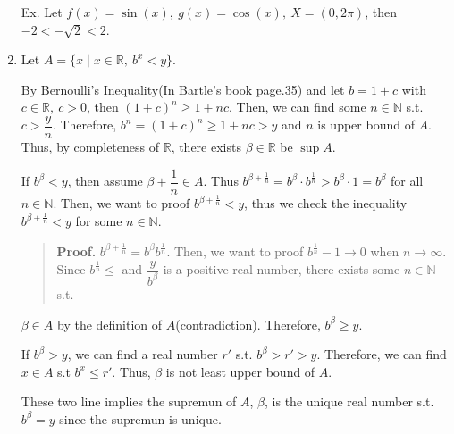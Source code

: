 \documentclass[12pt]{article}
\begin{document}
\begin{enumerate}
    Ex. Let $f(x) = \sin(x),\ g(x) = \cos(x),\ X = (0, 2\pi)$, then $-2 < -\sqrt{2} < 2$.

    \newpage

    \item Let $A = \lbrace x \mid x \in \mathbb{R},\ b^x < y\rbrace$.
    
    By Bernoulli's Inequality(In Bartle's book page.35) and let $b = 1+c$ with $c \in \mathbb{R},\ c > 0$, then $(1+c)^n \geq 1 + nc$.
    Then, we can find some $n \in \mathbb{N}$ s.t. $c > \dfrac{y}{n}$. Therefore, $b^n = (1+c)^n \geq 1+nc > y$ and $n$ is upper bound of $A$. Thus, by completeness of $\mathbb{R}$, there exists $\beta \in \mathbb{R}$ be $\sup A$. 
    
    If $b^\beta < y$, then assume $\beta + \dfrac{1}{n} \in A$. Thus $b^{\beta + \frac{1}{n}} = b^\beta \cdot b^\frac{1}{n} > b^\beta \cdot 1 = b^\beta$ for all $n \in \mathbb{N}$.
    Then, we want to proof $b^{\beta + \frac{1}{n}} < y$, thus we check the inequality $b^{\beta + \frac{1}{n}} < y$ for some $n \in \mathbb{N}$.
    \begin{quote}
        {\bf Proof.} $b^{\beta + \frac{1}{n}} = b^\beta b^{\frac{1}{n}}$. Then, we want to proof $b^{\frac{1}{n}} -1 \rightarrow 0$ when $n \rightarrow \infty$.
        Since $b^{\frac{1}{n}} \leq $ and $\dfrac{y}{b^\beta}$ is a positive real number, there exists some $n \in \mathbb{N}$ s.t. 
    \end{quote}
    
    $\beta \in A$ by the definition of $A$(contradiction).
    Therefore, $b^\beta \geq y$.
    
    If $b^\beta > y$,     
    we can find a real number $r'$ s.t. $b^\beta > r' > y$. Therefore, we can find $x \in A$ s.t $b^x \leq r'$. 
    Thus, $\beta$ is not least upper bound of $A$.

    These two line implies the supremun of $A$, $\beta$, is the unique real number s.t. $b^\beta = y$ since the supremun is unique.
\end{enumerate}
\end{document}

